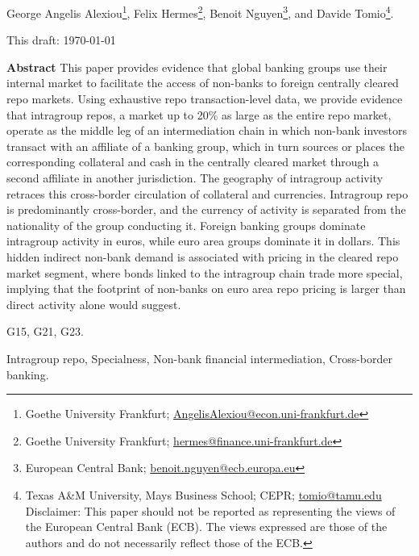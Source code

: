 \documentclass[english, 11pt, oneside, legal]{article}
\begin{document}
\def\sym#1{\ifmmode^{#1}\else\(^{#1}\)\fi}

\renewcommand{\thefootnote}{\fnsymbol{footnote}}

\vspace*{0.5in}


\vspace{0.2in}

\noindent
George Angelis Alexiou\footnote{Goethe University Frankfurt; \href{mailto:AngelisAlexiou@econ.uni-frankfurt.de}{AngelisAlexiou@econ.uni-frankfurt.de}}, 
Felix Hermes\footnote{Goethe University Frankfurt; \href{mailto:hermes@finance.uni-frankfurt.de}{hermes@finance.uni-frankfurt.de}}, 
Benoit Nguyen\footnote{European Central Bank; \href{mailto:benoit.nguyen@ecb.europa.eu}{benoit.nguyen@ecb.europa.eu}}, and
Davide Tomio\footnote{Texas A\&M University, Mays Business School; CEPR; \href{mailto:tomio@tamu.edu}{tomio@tamu.edu}\\ Disclaimer: This paper should not be reported as representing the views of the European Central Bank (ECB). The views expressed are those of the authors and do not necessarily reflect those of the ECB.}.

\vspace{0.25in}
\noindent This draft: \today \\

\vspace{0.25in}
{\noindent
{\bf Abstract}
\singlespacing
\small
\noindent This paper provides evidence that global banking groups use their internal market to facilitate the access of non-banks to foreign centrally cleared repo markets. Using exhaustive repo transaction-level data, we provide evidence that intragroup repos, a market up to 20\% as large as the entire repo market, operate as the middle leg of an intermediation chain in which non-bank investors transact with an affiliate of a banking group, which in turn sources or places the corresponding collateral and cash in the centrally cleared market through a second affiliate in another jurisdiction. The geography of intragroup activity retraces this cross-border circulation of collateral and currencies. Intragroup repo is predominantly cross-border, and the currency of activity is separated from the nationality of the group conducting it. Foreign banking groups dominate intragroup activity in euros, while euro area groups dominate it in dollars. This hidden indirect non-bank demand is associated with pricing in the cleared repo market segment, where bonds linked to the intragroup chain trade more special, implying that the footprint of non-banks on euro area repo pricing is larger than direct activity alone would suggest.

\vspace{0.5in}

 G15, G21, G23.

\vspace{0.25in}

 Intragroup repo, Specialness, Non-bank financial intermediation, Cross-border banking.
}
\end{document}
